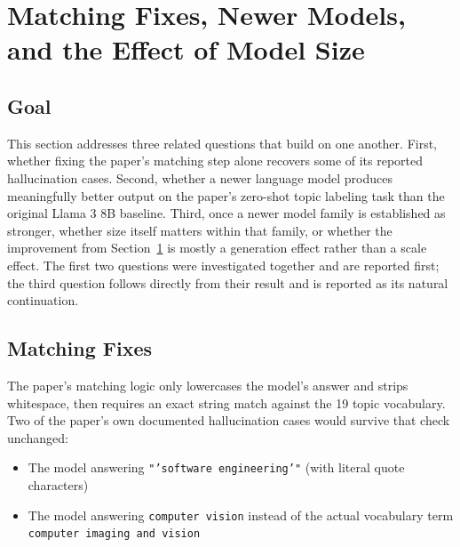 
\section{Matching Fixes, Newer Models, and the Effect of Model Size}
\label{sec:experiment1}

\subsection{Goal}

This section addresses three related questions that build on one another. First, whether fixing the paper's matching step alone recovers some of its reported hallucination cases. Second, whether a newer language model produces meaningfully better output on the paper's zero-shot topic labeling task than the original Llama 3 8B baseline. Third, once a newer model family is established as stronger, whether size itself matters within that family, or whether the improvement from Section~\ref{sec:experiment1} is mostly a generation effect rather than a scale effect. The first two questions were investigated together and are reported first; the third question follows directly from their result and is reported as its natural continuation.

\subsection{Matching Fixes}
\label{sec:matching-fixes}

The paper's matching logic only lowercases the model's answer and strips whitespace, then requires an exact string match against the 19 topic vocabulary. Two of the paper's own documented hallucination cases would survive that check unchanged:

\begin{itemize}
    \item The model answering \texttt{"'software engineering'"} (with literal quote characters)
    \item The model answering \texttt{computer vision} instead of the actual vocabulary term \texttt{computer imaging and vision}
\end{itemize}

